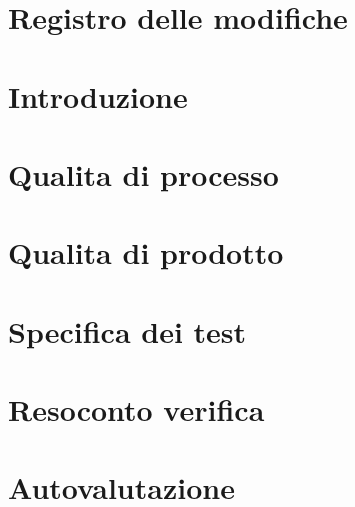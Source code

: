 \documentclass[a4paper, oneside, openany, dvipsnames, table]{article}
\begin{document}
\copertina{}

\section*{Registro delle modifiche}\label{sec:Registro-modifiche}


\newpage
\tableofcontents

\newpage
\listoftables

\newpage
\listoffigures

\newpage
\section{Introduzione}\label{sec:Introduzione}


\newpage
\section{Qualita di processo}\label{sec:Qualita-di-processo}


\newpage
\section{Qualita di prodotto}\label{sec:Qualita-di-prodotto}


\newpage
\section{Specifica dei test}\label{sec:Specifica-dei-test}


\newpage
\section{Resoconto verifica}\label{sec:Resoconto-verifica}


\newpage
\section{Autovalutazione}\label{sec:Autovalutazione}

\end{document}

